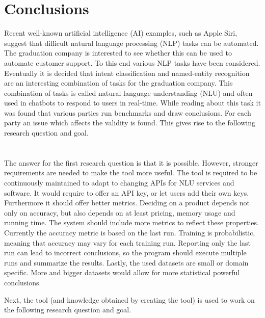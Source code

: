 \chapter{Conclusions}
\label{ch:conclusions}
Recent well-known artificial intelligence (AI) examples, such as Apple Siri, suggest that difficult natural language processing (NLP) tasks can be automated.
The graduation company is interested to see whether this can be used to automate customer support.
To this end various NLP tasks have been considered.
Eventually it is decided that intent classification and named-entity recognition are an interesting combination of tasks for the graduation company.
This combination of tasks is called natural language understanding (NLU) and often used in chatbots to respond to users in real-time.
While reading about this task it was found that various parties run benchmarks and draw conclusions.
For each party an issue which affects the validity is found.
This gives rise to the following research question and goal.\\

\rqone\\

\rgone\\

The answer for the first research question is that it is possible.
However, stronger requirements are needed to make the tool more useful.
The tool is required to be continuously maintained to adapt to changing APIs for NLU services and software.
It would require to offer an API key, or let users add their own keys.
Furthermore it should offer better metrics.
Deciding on a product depends not only on accuracy, but also depends on at least pricing, memory usage and running time.
The system should include more metrics to reflect these properties.
Currently the accuracy metric is based on the last run.
Training is probabilistic, meaning that accuracy may vary for each training run.
Reporting only the last run can lead to incorrect conclusions, so the program should execute multiple runs and summarize the results.
Lastly, the used datasets are small or domain specific.
More and bigger datasets would allow for more statistical powerful conclusions.

Next, the tool (and knowledge obtained by creating the tool) is used to work on the following research question and goal.\\

\rqtwo\\

